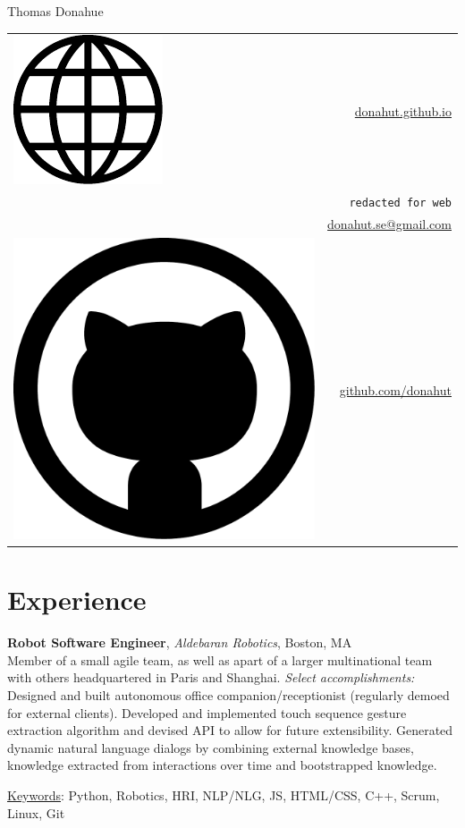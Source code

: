 \documentclass[10pt, letter]{article}
\newcommand*\globe{\includegraphics[height=1.6ex]{globe.pdf}}
\newcommand*\github{\includegraphics[height=2ex]{github.pdf}}
\newcommand{\years}[1]{\marginnote{\footnotesize #1}}
\newenvironment{desc*}{
  \begin{description}
    \setlength{\itemsep}{0.2pt}
    \setlength{\parskip}{-1pt}
    \setlength{\parsep}{0pt}
  }{
  \end{description}
}
\begin{document}
\begin{minipage}[t]{0.55\textwidth}
  {\Huge Thomas Donahue}
\end{minipage}
\begin{minipage}[t]{0.45\textwidth}
  \flushright 
  \begin{tabular}[h]{lr}
    \globe{}    & \href{http://donahut.github.io}{donahut.github.io}\\    
    \Phone{}    & \texttt{redacted for web}\\
    \Envelope{} & \href{mailto:donahut.se@gmail.com}{donahut.se@gmail.com}\\    
    \github{}   & \href{http://www.github.com/donahut}{github.com/donahut}
  \end{tabular}
\end{minipage}

\section*{Experience}
\years{Mar 2014 --} 
\textbf{Robot Software Engineer}, 
\textsl{Aldebaran  Robotics}, Boston, MA\\ 
Member of a small agile team, as well as apart of a larger
multinational team with others headquartered in Paris and Shanghai.
\textsl{Select accomplishments:} Designed and built autonomous office
companion/receptionist (regularly demoed for external clients).
Developed and implemented touch sequence gesture extraction algorithm
and devised API to allow for future extensibility. Generated dynamic
natural language dialogs by combining external knowledge bases,
knowledge extracted from interactions over time and bootstrapped
knowledge.
\vspace{-.1cm}
\begin{desc*}
\item[\rm \underline{Keywords}:] Python, Robotics, HRI, NLP/NLG, JS, HTML/CSS, C++, Scrum,
  Linux, Git
\end{desc*}
\end{document}

